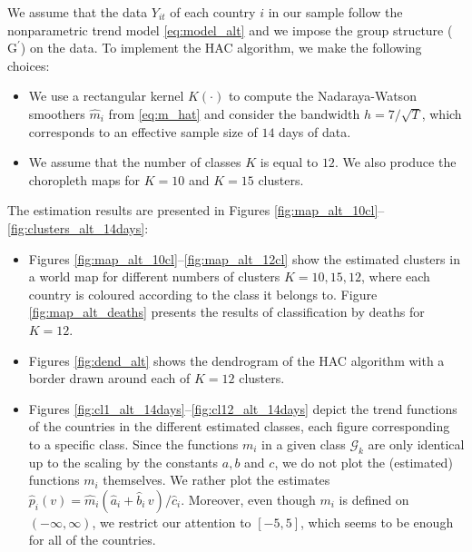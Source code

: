 \documentclass[a4paper,12pt]{article}
\numberwithin{equation}{section}
\begin{document}
We assume that the data $Y_{it}$ of each country $i$ in our sample follow the nonparametric trend model \eqref{eq:model_alt}
and we impose the group structure ($\text{G}^\prime$) on the data. 
To implement the HAC algorithm, we make the following choices:
\begin{itemize}[leftmargin=0.6cm]
\item We use a rectangular kernel $K(\cdot)$ to compute the Nadaraya-Watson smoothers $\hat{m}_{i}$ from \eqref{eq:m_hat} and consider the bandwidth $h = 7/\sqrt{T}$, which corresponds to an effective sample size of $14$ days of data. 
\item We assume that the number of classes $K$ is equal to $12$. We also produce the choropleth maps for $K=10$ and $K = 15$ clusters.
\end{itemize}
The estimation results are presented in Figures \ref{fig:map_alt_10cl}--\ref{fig:clusters_alt_14days}:
\begin{itemize}[leftmargin=0.6cm]
\item Figures \ref{fig:map_alt_10cl}--\ref{fig:map_alt_12cl} show the estimated clusters in a world map for different numbers of clusters $K =10, 15, 12$, where each country is coloured according to the class it belongs to. Figure \ref{fig:map_alt_deaths} presents the results of classification by deaths for $K =12$.
\item Figures \ref{fig:dend_alt} shows the dendrogram of the HAC algorithm with a border drawn around each of $K = 12$ clusters.
\item Figures \ref{fig:cl1_alt_14days}--\ref{fig:cl12_alt_14days} depict the trend functions of the countries in the different estimated classes, each figure corresponding to a specific class. Since the functions $m_i$ in a given class $\mathcal{G}_k$ are only identical up to the scaling by the constants $a, b$ and $c$, we do not plot the (estimated) functions $m_i$ themselves. We rather plot the estimates $\hat{p}_i(v) = \hat{m}_i(\hat{a}_i + \hat{b}_i \, v)/\hat{c}_i$. Moreover, even though $m_i$ is defined on $(-\infty, \infty)$, we restrict our attention to $[-5, 5]$, which seems to be enough for all of the countries.
\end{itemize}
\end{document}
